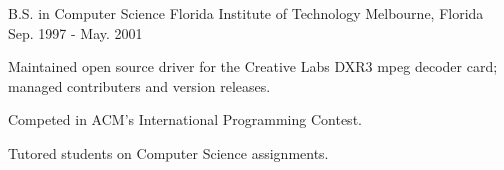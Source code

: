
\begin{cventries}

  \cventry
    {B.S. in Computer Science} %
    {Florida Institute of Technology} %
    {Melbourne, Florida} %
    {Sep. 1997 - May. 2001} %
    {
      \begin{cvitems} %
        \item {Maintained open source driver for the Creative Labs DXR3 mpeg decoder card; managed contributers and version releases.}
        \item {Competed in ACM's International Programming Contest.}
        \item {Tutored students on Computer Science assignments.}
        \end{cvitems}
    }

\end{cventries}
